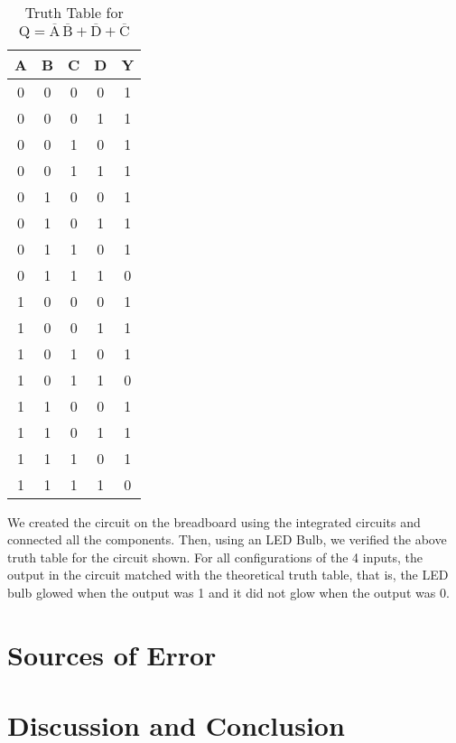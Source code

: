 \documentclass{scrartcl}
\begin{document}
\begin{table}[H]
    \centering
    \caption{Truth Table for \(\mathrm{ \mathrm{Q} = \overline{A}\,\overline{B} + \overline{D} + \overline{C} }\)}
    \vspace{0.2cm}
    \begin{tabular}{|c|c|c|c||c|}
    \hline
    \textbf{A} & \textbf{B} & \textbf{C} & \textbf{D} & \textbf{Y} \\
    \hline
    0 & 0 & 0 & 0 & 1 \\
    0 & 0 & 0 & 1 & 1 \\
    0 & 0 & 1 & 0 & 1 \\
    0 & 0 & 1 & 1 & 1 \\
    0 & 1 & 0 & 0 & 1 \\
    0 & 1 & 0 & 1 & 1 \\
    0 & 1 & 1 & 0 & 1 \\
    0 & 1 & 1 & 1 & 0 \\
    1 & 0 & 0 & 0 & 1 \\
    1 & 0 & 0 & 1 & 1 \\
    1 & 0 & 1 & 0 & 1 \\
    1 & 0 & 1 & 1 & 0 \\
    1 & 1 & 0 & 0 & 1 \\
    1 & 1 & 0 & 1 & 1 \\
    1 & 1 & 1 & 0 & 1 \\
    1 & 1 & 1 & 1 & 0 \\
    \hline
    \end{tabular}
    \end{table}
    \noindent
    We created the circuit on the breadboard using the integrated circuits and connected all the components. Then, using an LED Bulb, we verified the above truth table for the circuit shown. For all configurations of the 4 inputs, the output in the circuit matched with the theoretical truth table, that is, the LED bulb glowed when the output was 1 and it did not glow when the output was 0. \\[0.2cm]
\section{Sources of Error}
\section{Discussion and Conclusion}
\end{document}
